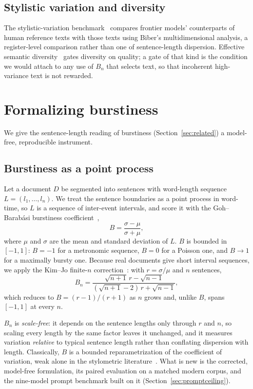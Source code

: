 \documentclass{article}
\begin{document}
\subsection{Stylistic variation and diversity}
The stylistic-variation benchmark~\citep{arxiv2025benchmark} compares frontier models'
counterparts of human reference texts with those texts using Biber's multidimensional analysis, a
register-level comparison rather than one of sentence-length dispersion. Effective semantic diversity~\citep{arxiv2025evaluating} gates diversity on
quality; a gate of that kind is the condition we would attach to any use of $B_n$ that selects
text, so that incoherent high-variance text is not rewarded.

\section{Formalizing burstiness}\label{sec:formalizing}

We give the sentence-length reading of burstiness (Section~\ref{sec:related}) a model-free,
reproducible instrument.

\subsection{Burstiness as a point process}
Let a document $D$ be segmented into sentences with word-length sequence $L = (l_1, \dots, l_n)$. We
treat the sentence boundaries as a point process in word-time, so $L$ is a sequence of inter-event
intervals, and score it with the Goh--Barab\'asi burstiness coefficient~\citep{goh2008burstiness},
\[
B = \frac{\sigma - \mu}{\sigma + \mu},
\]
where $\mu$ and $\sigma$ are the mean and standard deviation of $L$. $B$ is bounded in $[-1, 1]$:
$B = -1$ for a metronomic sequence, $B = 0$ for a Poisson one, and $B \to 1$ for
a maximally bursty one. Because real documents give short interval sequences, we apply the Kim--Jo
finite-$n$ correction~\citep{kim2016measuring}: with $r = \sigma / \mu$ and $n$ sentences,
\[
B_n = \frac{\sqrt{n+1}\,r - \sqrt{n-1}}{(\sqrt{n+1} - 2)\,r + \sqrt{n-1}},
\]
which reduces to $B = (r-1)/(r+1)$ as $n$ grows and, unlike $B$, spans $[-1, 1]$ at every $n$.

$B_n$ is \emph{scale-free}: it depends on the sentence lengths only through $r$ and $n$, so scaling
every length by the same factor leaves it unchanged, and it measures variation \emph{relative} to
typical sentence length rather than conflating dispersion with length. Classically, $B$ is a bounded reparametrization of the coefficient of
variation, weak alone in the stylometric literature~\citep{yule1939sentence, williams1940note}. What
is new is the corrected, model-free formulation, its paired evaluation on a matched modern corpus,
and the nine-model prompt benchmark built on it (Section~\ref{sec:promptceiling}).
\end{document}
